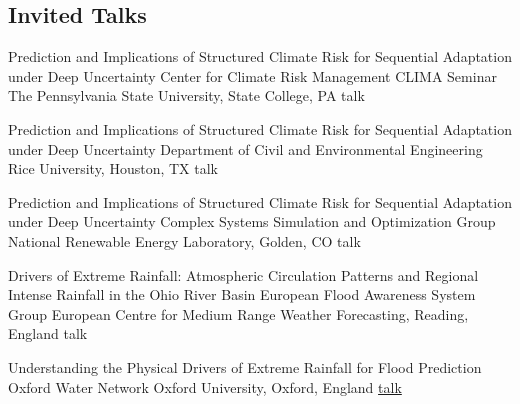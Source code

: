 \subsection{Invited Talks}

{Prediction and Implications of Structured Climate Risk for Sequential Adaptation under Deep Uncertainty}
{Center for Climate Risk Management CLIMA Seminar}
{The Pennsylvania State University, State College, PA}
{talk}
{}

{Prediction and Implications of Structured Climate Risk for Sequential Adaptation under Deep Uncertainty}
{Department of Civil and Environmental Engineering}
{Rice University, Houston, TX}
{talk}
{}

{Prediction and Implications of Structured Climate Risk for Sequential Adaptation under Deep Uncertainty}
{Complex Systems Simulation and Optimization Group}
{National Renewable Energy Laboratory, Golden, CO}
{talk}
{}

{Drivers of Extreme Rainfall: Atmospheric  Circulation Patterns and Regional Intense Rainfall in the Ohio River Basin}
{European Flood Awareness System Group}
{European Centre for Medium Range Weather Forecasting, Reading, England}
{talk}
{}

{Understanding the Physical Drivers of Extreme Rainfall for Flood Prediction}
{Oxford Water Network}
{Oxford University, Oxford, England}
{\href{https://www.water.ox.ac.uk/understanding-the-physical-drivers-of-extreme-rainfall-for-flood-prediction/}{talk}}
{}
